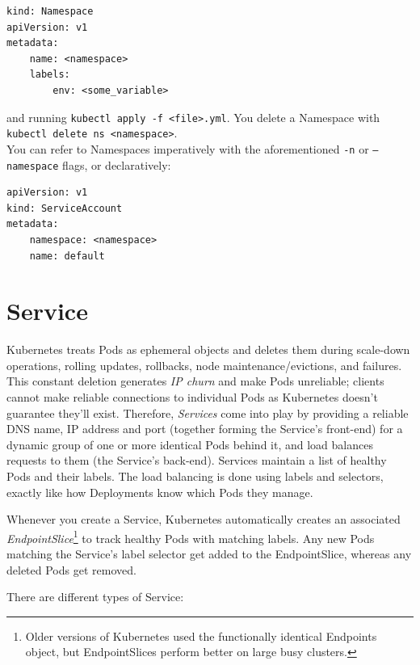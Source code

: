 \documentclass[table, xcdraw]{article}%
\begin{document}
\begin{verbatim}
kind: Namespace
apiVersion: v1
metadata:
    name: <namespace>
    labels:
        env: <some_variable>
\end{verbatim}

and running \texttt{kubectl apply -f <file>.yml}. You delete a Namespace with \texttt{kubectl delete ns <namespace>}.\\
You can refer to Namespaces imperatively with the aforementioned \texttt{-n} or \texttt{--namespace} flags, or declaratively:

\begin{verbatim}
apiVersion: v1
kind: ServiceAccount
metadata:
    namespace: <namespace>
    name: default
\end{verbatim}

\section{Service}

Kubernetes treats Pods as ephemeral objects and deletes them during scale-down operations, rolling updates, rollbacks, node maintenance/evictions, and failures. This constant deletion generates \emph{IP churn} and make Pods unreliable; clients cannot make reliable connections to individual Pods as Kubernetes doesn’t guarantee they’ll exist. Therefore, \emph{Services} come into play by providing a reliable DNS name, IP address and port (together forming the Service's front-end) for a dynamic group of one or more identical Pods behind it, and load balances requests to them (the Service's back-end). Services maintain a list of healthy Pods and their labels. The load balancing is done using labels and selectors, exactly like how Deployments know which Pods they manage.

Whenever you create a Service, Kubernetes automatically creates an associated \emph{EndpointSlice}\footnote{Older versions of Kubernetes used the functionally identical Endpoints object, but EndpointSlices perform better on large busy clusters.} to track healthy Pods with matching labels. Any new Pods matching the Service’s label selector get added to the EndpointSlice, whereas any deleted Pods get removed.

There are different types of Service:
\end{document}
